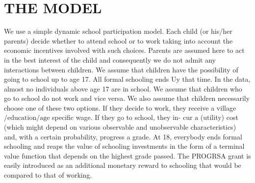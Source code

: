 \documentclass{handoutForSolutions}
\begin{document}
\newpage

\section{THE MODEL}
We use a simple dynamic school participation model. Each child (or his/her parents) decide whether to attend school or to work taking into account the economic incentives involved with such choices. Parents are assumed here to act in the best interest of the child and consequently we do not admit any interactions between children. We assume that children have the possibility of going to school up to age 17. All formal schooling ends Uy that time. In the data, almost no individuals above age 17 are in school. We assume that children who go to school do not work and vice versa. We also assume that children necessarily choose one of these two options. If they decide to work, they receive a village $/\mathrm{e}\mathrm{d}\mathrm{u}\mathrm{c}\mathrm{a}\mathrm{t}\mathrm{i}\mathrm{o}\mathrm{n}/\mathrm{a}\mathrm{g}\mathrm{e}$ specific wage. If they go to school, they in- cur $\mathrm{a}$ (utility) cost (which might depend on various observable and unobservable characteristics) and, with a certain probability, progress a grade. At 18, everybody ends formal schooling and reaps the value of schooling investments in the form of a terminal value function that depends on the highest grade passed. The PROGRSA grant is easily introduced as an additional monetary reward to schooling that would be compared to that of working.
\end{document}
